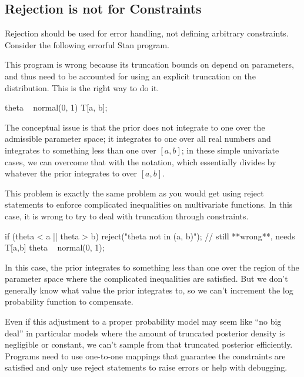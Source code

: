 \subsection{Rejection is not for Constraints}

Rejection should be used for error handling, not defining arbitrary
constraints.  Consider the following errorful Stan program.
%
\begin{stancode}
parameters {
  real a;
  real<lower=a> b;
  real<lower=a, upper=b> theta;
  ...
model {
  // **wrong** needs explicit truncation
  theta ~ normal(0, 1); 
  ...
\end{stancode}
%
This program is wrong because its truncation bounds on 
depend on parameters, and thus need to be accounted for using an
explicit truncation on the distribution.  This is the right way to do
it.  
%
\begin{stancode}
  theta ~ normal(0, 1) T[a, b];
\end{stancode}
%
The conceptual issue is that the prior does not integrate to one over
the admissible parameter space; it integrates to one over all real
numbers and integrates to something less than one over $[a ,b]$; in
these simple univariate cases, we can overcome that with the
 notation, which essentially divides by whatever the
prior integrates to over $[a, b]$.

This problem is exactly the same problem as you would get using reject
statements to enforce complicated inequalities on multivariate
functions.  In this case, it is wrong to try to deal with truncation
through constraints.
%
\begin{stancode}
  if (theta < a || theta > b)
    reject("theta not in (a, b)");
  // still **wrong**, needs T[a,b]
  theta ~ normal(0, 1);
\end{stancode} 
%
In this case, the prior integrates to something less than one over the
region of the parameter space where the complicated inequalities are
satisfied. But we don't generally know what value the prior integrates
to, so we can't increment the log probability function to compensate.

Even if this adjustment to a proper probability model may seem like
``no big deal'' in particular models where the amount of truncated
posterior density is negligible or constant, we can't sample from that
truncated posterior efficiently.  Programs need to use one-to-one
mappings that guarantee the constraints are satisfied and only use
reject statements to raise errors or help with debugging.



